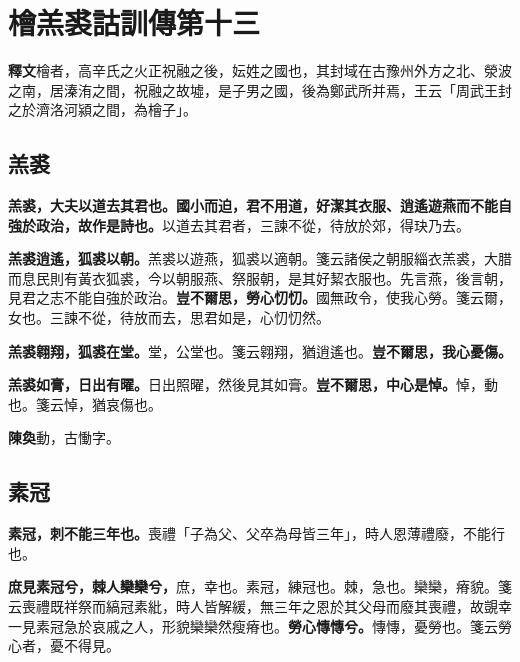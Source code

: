 \chapter{檜羔裘詁訓傳第十三}

\begin{quoting}\textbf{釋文}檜者，高辛氏之火正祝融之後，妘姓之國也，其封域在古豫州外方之北、滎波之南，居溱洧之間，祝融之故墟，是子男之國，後為鄭武所并焉，王云「周武王封之於濟洛河潁之間，為檜子」。\end{quoting}

\section{羔裘}


\textbf{羔裘，大夫以道去其君也。國小而迫，君不用道，好潔其衣服、逍遙遊燕而不能自強於政治，故作是詩也。}{\footnotesize 以道去其君者，三諫不從，待放於郊，得玦乃去。}

\textbf{羔裘逍遙，狐裘以朝。}{\footnotesize 羔裘以遊燕，狐裘以適朝。箋云諸侯之朝服緇衣羔裘，大腊而息民則有黃衣狐裘，今以朝服燕、祭服朝，是其好絜衣服也。先言燕，後言朝，見君之志不能自強於政治。}\textbf{豈不爾思，勞心忉忉。}{\footnotesize 國無政令，使我心勞。箋云爾，女也。三諫不從，待放而去，思君如是，心忉忉然。}

\textbf{羔裘翱翔，狐裘在堂。}{\footnotesize 堂，公堂也。箋云翱翔，猶逍遙也。}\textbf{豈不爾思，我心憂傷。}

\textbf{羔裘如膏，日出有曜。}{\footnotesize 日出照曜，然後見其如膏。}\textbf{豈不爾思，中心是悼。}{\footnotesize 悼，動也。箋云悼，猶哀傷也。}

\begin{quoting}\textbf{陳奐}動，古慟字。\end{quoting}

\section{素冠}


\textbf{素冠，刺不能三年也。}{\footnotesize 喪禮「子為父、父卒為母皆三年」，時人恩薄禮廢，不能行也。}

\textbf{庶見素冠兮，棘人欒欒兮，}{\footnotesize 庶，幸也。素冠，練冠也。棘，急也。欒欒，瘠貌。箋云喪禮既祥祭而縞冠素紕，時人皆解緩，無三年之恩於其父母而廢其喪禮，故覬幸一見素冠急於哀戚之人，形貌欒欒然瘦瘠也。}\textbf{勞心慱慱兮。}{\footnotesize 慱慱，憂勞也。箋云勞心者，憂不得見。}

